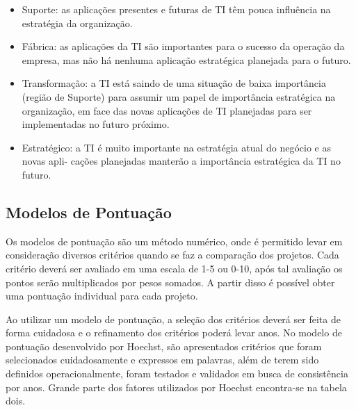 \documentclass[12pt,a4paper,ruledheader,tocpage=prefix,floatnumber=continuous,pagestart=folhaderosto,font=times]{abnt}
\begin{document}
\begin{itemize}
 \item Suporte: as aplicações presentes e futuras de TI têm pouca influência na estratégia da
	organização.
  \item Fábrica: as aplicações da TI são importantes para o sucesso da operação da empresa, 
	mas não há nenhuma aplicação estratégica planejada para o futuro.
  \item Transformação: a TI está saindo de uma situação de baixa importância (região de
	Suporte) para assumir um papel de importância estratégica na organização, em
        face das novas aplicações de TI planejadas para ser implementadas no futuro próximo.
  \item Estratégico: a TI é muito importante na estratégia atual do negócio e as novas apli-
        cações planejadas manterão a importância estratégica da TI no futuro.
\end{itemize}

\subsection{Modelos de Pontuação}
Os modelos de pontuação são um método numérico, onde é permitido levar em consideração diversos critérios quando se faz a comparação dos projetos. Cada
critério deverá ser avaliado em uma escala de 1-5 ou 0-10, após tal avaliação os pontos serão multiplicados por pesos somados. A partir disso é possível
obter uma pontuação individual para cada projeto. 

Ao utilizar um modelo de pontuação, a seleção dos critérios deverá ser feita de forma cuidadosa e o refinamento dos critérios poderá levar anos. No modelo 
de pontuação desenvolvido por Hoechst, são apresentados critérios que foram selecionados cuidadosamente e expressos em palavras, além de terem sido definidos 
operacionalmente, foram testados e validados em busca de consistência por anos. Grande parte dos fatores utilizados por Hoechst encontra-se na tabela dois.
\end{document}
